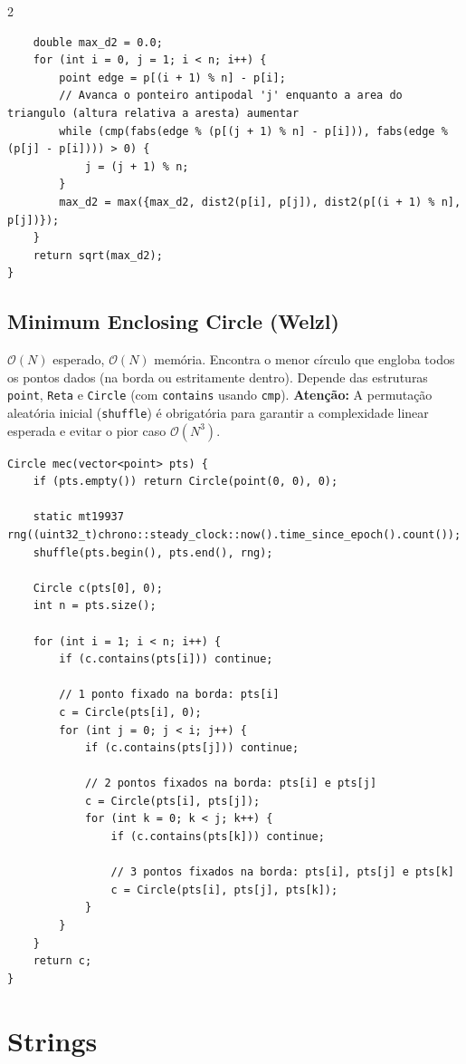 \documentclass[11pt]{article}
\begin{document}
\begin{multicols}{2}
\begin{lstlisting}
    double max_d2 = 0.0;
    for (int i = 0, j = 1; i < n; i++) {
        point edge = p[(i + 1) % n] - p[i];
        // Avanca o ponteiro antipodal 'j' enquanto a area do triangulo (altura relativa a aresta) aumentar
        while (cmp(fabs(edge % (p[(j + 1) % n] - p[i])), fabs(edge % (p[j] - p[i]))) > 0) {
            j = (j + 1) % n;
        }
        max_d2 = max({max_d2, dist2(p[i], p[j]), dist2(p[(i + 1) % n], p[j])});
    }
    return sqrt(max_d2);
}
\end{lstlisting}

\subsection{Minimum Enclosing Circle (Welzl)}
$\mathcal{O}(N)$ esperado, $\mathcal{O}(N)$ memória. Encontra o menor círculo que engloba todos os pontos dados (na borda ou estritamente dentro). Depende das estruturas \texttt{point}, \texttt{Reta} e \texttt{Circle} (com \texttt{contains} usando \texttt{cmp}). \textbf{Atenção:} A permutação aleatória inicial (\texttt{shuffle}) é obrigatória para garantir a complexidade linear esperada e evitar o pior caso $\mathcal{O}(N^3)$.
\begin{lstlisting}
Circle mec(vector<point> pts) {
    if (pts.empty()) return Circle(point(0, 0), 0);
    
    static mt19937 rng((uint32_t)chrono::steady_clock::now().time_since_epoch().count());
    shuffle(pts.begin(), pts.end(), rng);
    
    Circle c(pts[0], 0);
    int n = pts.size();
    
    for (int i = 1; i < n; i++) {
        if (c.contains(pts[i])) continue;
        
        // 1 ponto fixado na borda: pts[i]
        c = Circle(pts[i], 0);
        for (int j = 0; j < i; j++) {
            if (c.contains(pts[j])) continue;
            
            // 2 pontos fixados na borda: pts[i] e pts[j]
            c = Circle(pts[i], pts[j]);
            for (int k = 0; k < j; k++) {
                if (c.contains(pts[k])) continue;
                
                // 3 pontos fixados na borda: pts[i], pts[j] e pts[k]
                c = Circle(pts[i], pts[j], pts[k]);
            }
        }
    }
    return c;
}
\end{lstlisting}


\section{Strings}


\end{multicols}
\end{document}
